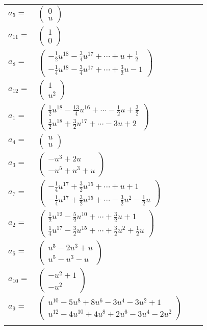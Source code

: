 \documentclass[1p]{elsarticle_modified}
\theoremstyle{definition}
\begin{document}
\begin{tabular}{m{7pt} m{180pt} m{7pt} m{180pt} }
\flushright $a_{5}=$&$\begin{pmatrix}0\\u\end{pmatrix}$ \\
\flushright $a_{11}=$&$\begin{pmatrix}1\\0\end{pmatrix}$ \\
\flushright $a_{8}=$&$\begin{pmatrix}-\frac{1}{2} u^{18}-\frac{3}{4} u^{17}+\cdots+u+\frac{1}{2}\\-\frac{1}{4} u^{18}-\frac{3}{4} u^{17}+\cdots+\frac{3}{2} u-1\end{pmatrix}$ \\
\flushright $a_{12}=$&$\begin{pmatrix}1\\u^2\end{pmatrix}$ \\
\flushright $a_{1}=$&$\begin{pmatrix}\frac{1}{2} u^{18}-\frac{13}{4} u^{16}+\cdots-\frac{1}{2} u+\frac{3}{2}\\\frac{3}{2} u^{18}+\frac{3}{2} u^{17}+\cdots-3 u+2\end{pmatrix}$ \\
\flushright $a_{4}=$&$\begin{pmatrix}u\\u\end{pmatrix}$ \\
\flushright $a_{3}=$&$\begin{pmatrix}- u^3+2 u\\- u^5+u^3+u\end{pmatrix}$ \\
\flushright $a_{7}=$&$\begin{pmatrix}-\frac{1}{4} u^{17}+\frac{3}{2} u^{15}+\cdots+u+1\\-\frac{1}{4} u^{17}+\frac{3}{2} u^{15}+\cdots-\frac{3}{2} u^2-\frac{1}{2} u\end{pmatrix}$ \\
\flushright $a_{2}=$&$\begin{pmatrix}\frac{1}{2} u^{12}-\frac{5}{2} u^{10}+\cdots+\frac{3}{2} u+1\\\frac{1}{4} u^{17}-\frac{3}{2} u^{15}+\cdots+\frac{3}{2} u^2+\frac{1}{2} u\end{pmatrix}$ \\
\flushright $a_{6}=$&$\begin{pmatrix}u^5-2 u^3+u\\u^5- u^3- u\end{pmatrix}$ \\
\flushright $a_{10}=$&$\begin{pmatrix}- u^2+1\\- u^2\end{pmatrix}$ \\
\flushright $a_{9}=$&$\begin{pmatrix}u^{10}-5 u^8+8 u^6-3 u^4-3 u^2+1\\u^{12}-4 u^{10}+4 u^8+2 u^6-3 u^4-2 u^2\end{pmatrix}$\\&\end{tabular}
\end{document}
